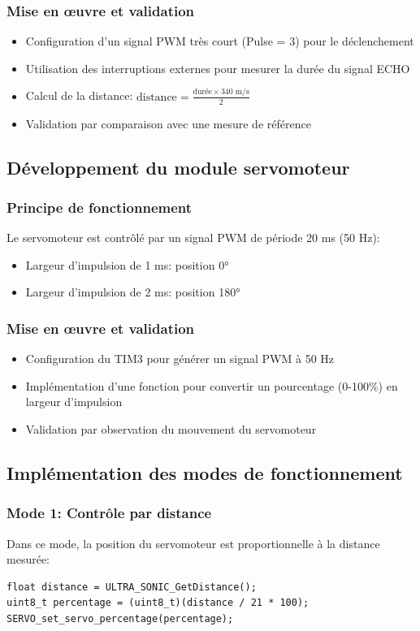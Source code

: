 \subsubsection{Mise en œuvre et validation}
\begin{itemize}
    \item Configuration d'un signal PWM très court (Pulse = 3) pour le déclenchement
    \item Utilisation des interruptions externes pour mesurer la durée du signal ECHO
    \item Calcul de la distance: $\text{distance} = \frac{\text{durée} \times 340 \text{ m/s}}{2}$
    \item Validation par comparaison avec une mesure de référence
\end{itemize}

\subsection{Développement du module servomoteur}
\subsubsection{Principe de fonctionnement}
Le servomoteur est contrôlé par un signal PWM de période 20 ms (50 Hz):
\begin{itemize}
    \item Largeur d'impulsion de 1 ms: position 0°
    \item Largeur d'impulsion de 2 ms: position 180°
\end{itemize}

\subsubsection{Mise en œuvre et validation}
\begin{itemize}
    \item Configuration du TIM3 pour générer un signal PWM à 50 Hz
    \item Implémentation d'une fonction pour convertir un pourcentage (0-100\%) en largeur d'impulsion
    \item Validation par observation du mouvement du servomoteur
\end{itemize}

\subsection{Implémentation des modes de fonctionnement}
\subsubsection{Mode 1: Contrôle par distance}
Dans ce mode, la position du servomoteur est proportionnelle à la distance mesurée:
\begin{lstlisting}[caption={Contrôle par distance}, label={lst:mode1}]
float distance = ULTRA_SONIC_GetDistance();
uint8_t percentage = (uint8_t)(distance / 21 * 100);
SERVO_set_servo_percentage(percentage);
\end{lstlisting}

